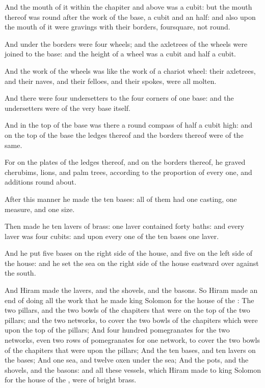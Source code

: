\Verse And the mouth of it within the chapiter and above was a cubit: but the mouth thereof was round after the work of the base, a cubit and an half: and also upon the mouth of it were gravings with their borders, foursquare, not round.

\Verse And under the borders were four wheels; and the axletrees of the wheels were joined to the base: and the height of a wheel was a cubit and half a cubit.

\Verse And the work of the wheels was like the work of a chariot wheel: their axletrees, and their naves, and their felloes, and their spokes, were all molten.

\Verse And there were four undersetters to the four corners of one base: and the undersetters were of the very base itself.

\Verse And in the top of the base was there a round compass of half a cubit high: and on the top of the base the ledges thereof and the borders thereof were of the same.

\Verse For on the plates of the ledges thereof, and on the borders thereof, he graved cherubims, lions, and palm trees, according to the proportion of every one, and additions round about.

\Verse After this manner he made the ten bases: all of them had one casting, one measure, and one size.

\Verse Then made he ten lavers of brass: one laver contained forty baths: and every laver was four cubits: and upon every one of the ten bases one laver.

\Verse And he put five bases on the right side of the house, and five on the left side of the house: and he set the sea on the right side of the house eastward over against the south.

\Verse And Hiram made the lavers, and the shovels, and the basons. So Hiram made an end of doing all the work that he made king Solomon for the house of the \LORD: \Verse The two pillars, and the two bowls of the chapiters that were on the top of the two pillars; and the two networks, to cover the two bowls of the chapiters which were upon the top of the pillars; \Verse And four hundred pomegranates for the two networks, even two rows of pomegranates for one network, to cover the two bowls of the chapiters that were upon the pillars; \Verse And the ten bases, and ten lavers on the bases; \Verse And one sea, and twelve oxen under the sea; \Verse And the pots, and the shovels, and the basons: and all these vessels, which Hiram made to king Solomon for the house of the \LORD, were of bright brass.

